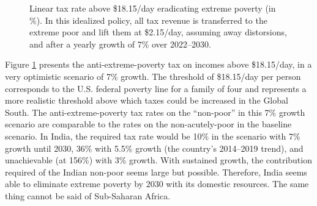 \begin{figure}[b!]
  \caption[Anti-extreme-poverty tax above \$18.15/day in 2030 after 3\% growth.]{Linear tax rate above \$18.15/day eradicating extreme poverty (in \%). In this idealized policy, all tax revenue is transferred to the extreme poor and lift them at \$2.15/day, assuming away distorsions, and after a yearly growth of 7\% over 2022--2030.
  }\label{fig:antipoverty_tax_18}
\end{figure}

Figure \ref{fig:antipoverty_tax_18} presents the anti-extreme-poverty tax on incomes above \$18.15/day, in a very optimistic scenario of 7\% growth. The threshold of \$18.15/day per person corresponds to the U.S. federal poverty line for a family of four and represents a more realistic threshold above which taxes could be increased in the Global South. The anti-extreme-poverty tax rates on the ``non-poor'' %
in this 7\% growth scenario are comparable to the rates on the non-acutely-poor in the baseline scenario. In India, the required tax rate would be 10\% %
in the scenario with 7\% growth until 2030, 36\% with 5.5\% growth (the country's 2014--2019 trend), and unachievable (at 156\%) with 3\% growth. %
With sustained growth, the contribution required of the Indian non-poor seems large but possible. %
Therefore, India seems able to eliminate extreme poverty by 2030 with its domestic resources. The same thing cannot be said of Sub-Saharan Africa. %

